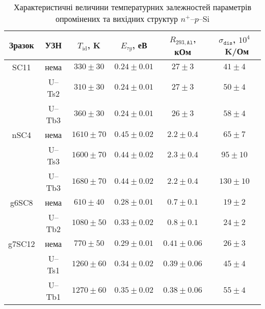 \begin{table}[b]
\caption{\label{tabSSCparRD}Характеристичні величини температурних залежностей параметрів опромінених та вихідних
структур $n^+$--$p$--Si
}
\centering
\begin{tabular}{|c|c|c|c|c|c|} \hline
Зразок&УЗН&$T_{\mathrm{id}}$, K&$E_{\tau g}$, еВ&$R_{293,\mathtt{Al}}$, кОм&$\sigma_{\mathtt{dis}}$, $10^4$~K/Ом\\
\hline
SC11&нема&$330\pm30$&$0.24\pm0.01$&$27\pm3$&$41\pm4$\\ \hline
&U--Ts2&$310\pm30$&$0.24\pm0.01$&$27\pm3$&$50\pm4$\\ \hline
&U--Tb3&$360\pm30$&$0.24\pm0.01$&$26\pm3$&$58\pm4$\\ \hline
nSC4&нема&$1610\pm70$&$0.45\pm0.02$&$2.2\pm0.4$&$65\pm7$\\ \hline
&U--Ts3&$1600\pm70$&$0.44\pm0.02$&$2.3\pm0.4$&$95\pm10$\\ \hline
&U--Tb3&$1680\pm70$&$0.44\pm0.02$&$2.2\pm0.4$&$130\pm10$\\ \hline
g6SC8&нема&$610\pm40$&$0.28\pm0.01$&$0.7\pm0.1$&$19\pm2$\\ \hline
&U--Tb2&$1080\pm50$&$0.33\pm0.02$&$0.8\pm0.1$&$24\pm2$\\ \hline
g7SC12&нема&$770\pm50$&$0.29\pm0.01$&$0.41\pm0.06$&$26\pm3$\\ \hline
&U--Ts1&$1260\pm60$&$0.34\pm0.02$&$0.39\pm0.06$&$45\pm4$\\ \hline
&U--Tb1&$1270\pm60$&$0.35\pm0.02$&$0.38\pm0.06$&$55\pm4$\\ \hline
\end{tabular}
\end{table}

